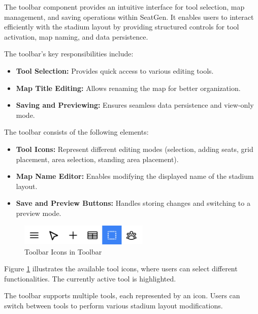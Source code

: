 The toolbar component provides an intuitive interface for tool selection, map management, and saving operations within SeatGen. It enables users to interact efficiently with the stadium layout by providing structured controls for tool activation, map naming, and data persistence.

The toolbar’s key responsibilities include:
\begin{itemize}
    \item \textbf{Tool Selection:} Provides quick access to various editing tools.
    \item \textbf{Map Title Editing:} Allows renaming the map for better organization.
    \item \textbf{Saving and Previewing:} Ensures seamless data persistence and view-only mode.
\end{itemize}

The toolbar consists of the following elements:
\begin{itemize}
    \item \textbf{Tool Icons:} Represent different editing modes (selection, adding seats, grid placement, area selection, standing area placement).
    \item \textbf{Map Name Editor:} Enables modifying the displayed name of the stadium layout.
    \item \textbf{Save and Preview Buttons:} Handles storing changes and switching to a preview mode.
\end{itemize}

\begin{figure}[H]
    \centering
    \includegraphics[width=0.55\textwidth]{pics/toolbar01.png}
    \caption{Toolbar Icons in Toolbar}
    \label{fig:toolbar-icons}
\end{figure}

Figure \ref{fig:toolbar-icons} illustrates the available tool icons, where users can select different functionalities. The currently active tool is highlighted.

The toolbar supports multiple tools, each represented by an icon. Users can switch between tools to perform various stadium layout modifications.

